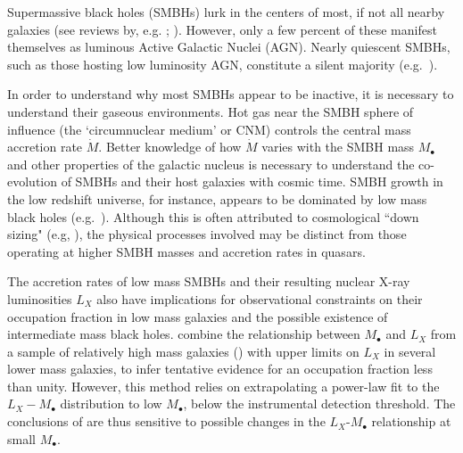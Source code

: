 \documentclass[usenatbib,fleqn]{mn2e}
\newcommand{\Mbh}[1][]{M_{\bullet#1}}
\begin{document}
Supermassive black holes (SMBHs) lurk in the centers of most, if not all nearby galaxies (see reviews by,
e.g. \citealt{KormendyRichstone:1995a}; \citealt{FerrareseFord:2005a}). However, only a few percent of these manifest
themselves as luminous Active Galactic Nuclei (AGN).  Nearly quiescent SMBHs, such as those hosting low luminosity AGN, constitute a silent majority (e.g.~\citealt{Ho:2009a}).  

In order to understand why most SMBHs appear to be inactive, it is necessary to understand their gaseous environments.  Hot gas near the SMBH sphere of influence (the `circumnuclear medium' or CNM) controls the central mass accretion rate $\dot{M}$.  Better knowledge of how $\dot{M}$ varies with the SMBH mass $\Mbh$ and other properties of the galactic nucleus is necessary to understand the co-evolution of SMBHs and their host galaxies with cosmic time.  SMBH growth in the low redshift universe, for instance, appears to be dominated by low mass black holes (e.g.~\citealt{Heckman+04}).  Although this is often attributed to cosmological ``down sizing" (e.g, \citealt{Gallo+08}), the physical processes involved may be distinct from those operating at higher SMBH masses and accretion rates in quasars.  

The accretion rates of low mass SMBHs and their resulting nuclear X-ray luminosities $L_X$ also have implications for observational constraints on their occupation fraction in low mass galaxies and the possible existence of intermediate mass black holes.  \citet{MillerGallo+:2014a} combine the relationship between $\Mbh$ and $L_X$ from a sample of relatively high mass galaxies (\citealt{Gallo+08}) with upper limits on $L_X$ in several lower mass galaxies, to infer tentative evidence for an occupation fraction less than unity.  However, this method relies on extrapolating a power-law fit to the $L_X-\Mbh$ distribution to low $\Mbh$, below the instrumental detection threshold.  The conclusions of \citet{MillerGallo+:2014a} are thus sensitive to possible changes in the $L_X$-$\Mbh$ relationship at small $\Mbh$.
\end{document}
